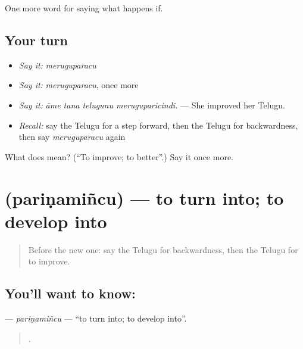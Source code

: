 \begin{grammarlens}[title={What you've built}]
One more word for saying what happens if.
\end{grammarlens}

\subsection*{Your turn}
\begin{itemize}
\raggedright
  \item \emph{Say it:} \emph{meruguparacu}
  \item \emph{Say it:} \emph{meruguparacu}, once more
  \item \emph{Say it:} \emph{āme tana telugunu meruguparicindi.} — She improved her Telugu.
  \item \emph{Recall:} say the Telugu for a step forward, then the Telugu for backwardness, then say \emph{meruguparacu} again
\end{itemize}

\begin{tcolorbox}[breakable,colback=teal!4,colframe=teal!35!black,title={Before you move on}]
What does  mean? (\textquotedblleft{}To improve; to better\textquotedblright{}.) Say it once more.
\end{tcolorbox}
\section[\texorpdfstring{\te{పరిణమించు} (pariṇamiñcu)}{పరిణమించు (pariṇamiñcu)}]{ (pariṇamiñcu) — to turn into; to develop into}

\label{lesson:TE-C429-parinamincu}



\begin{quote}
Before the new one: say the Telugu for backwardness, then the Telugu for to improve.
\end{quote}

\subsection*{You'll want to know: }
\textbf{} — \emph{pariṇamiñcu} — \textquotedblleft{}to turn into; to develop into\textquotedblright{}.

\begin{quote}
    .
\end{quote}

